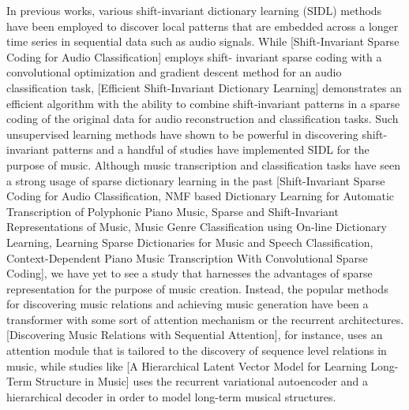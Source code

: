 \documentclass[11pt,a4paper]{article}
\begin{document}
In previous works, various shift-invariant dictionary learning (SIDL) methods have been employed to discover local patterns that are embedded across a longer time series in sequential data such as audio signals. While [Shift-Invariant Sparse Coding for Audio Classification] employs shift-
invariant sparse coding with a convolutional optimization and gradient descent method for an audio classification task, [Efficient Shift-Invariant Dictionary Learning] demonstrates an efficient algorithm with the ability to combine shift-invariant patterns in a sparse coding of the original data for audio reconstruction and classification tasks. Such unsupervised learning methods have shown to be powerful in discovering shift-invariant patterns and a handful of studies have implemented SIDL for the purpose of music. Although music transcription and classification tasks have seen a strong usage of sparse dictionary learning in the past [Shift-Invariant Sparse Coding for Audio Classification, NMF based Dictionary Learning for Automatic Transcription of Polyphonic Piano Music, Sparse and Shift-Invariant Representations of Music, Music Genre Classification using On-line Dictionary Learning, Learning Sparse Dictionaries for Music and Speech Classification, Context-Dependent Piano Music Transcription With Convolutional Sparse Coding], we have yet to see a study that harnesses the advantages of sparse representation for the purpose of music creation. Instead, the popular methods for discovering music relations and achieving music generation have been a transformer with some sort of attention mechanism or the recurrent architectures. [Discovering Music Relations with Sequential Attention], for instance, uses an attention module that is tailored to the discovery of sequence level relations in music, while studies like [A Hierarchical Latent Vector Model for Learning Long-Term Structure in Music] uses the recurrent variational autoencoder and a hierarchical decoder in order to model long-term musical structures. 
\end{document}
